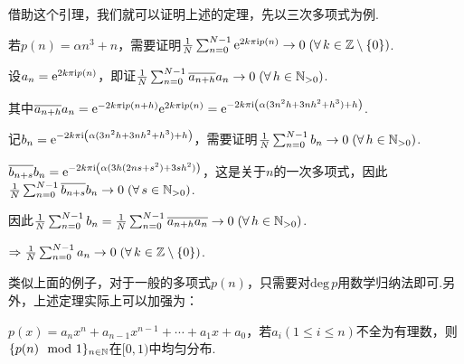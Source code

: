 借助这个引理，我们就可以证明上述的定理，先以三次多项式为例.
\begin{instance}
    若$p(n)=\alpha n^3+n$，需要证明$\frac{1}{N}\sum_{n=0}^{N-1}{\mathrm{e}^{2k\pi \mathrm{i} p(n)}}\to 0\;(\forall\, k\in\mathbb{Z}\setminus\{0\})$.\par
    设$a_n=\mathrm{e}^{2k\pi \mathrm{i} p(n)}$，即证$\frac{1}{N}\sum_{n=0}^{N-1}{\overline{a_{n+h}}a_n}\to 0\;(\forall\, h\in\mathbb{N}_{>0})$. \par
    其中$\overline{a_{n+h}}a_n=\mathrm{e}^{-2k\pi \mathrm{i} p(n+h)}\mathrm{e}^{2k\pi \mathrm{i} p(n)}=\mathrm{e}^{-2k\pi \mathrm{i} \left(\alpha(3n^2h+3nh^2+h^3)+h\right)}$.\par
    记$b_n=\mathrm{e}^{-2k\pi \mathrm{i} \left(\alpha(3n^2h+3nh^2+h^3)+h\right)}$，需要证明$\frac{1}{N}\sum_{n=0}^{N-1}{b_n}\to 0\;(\forall\, h\in\mathbb{N}_{>0})$.\par
    $\overline{b_{n+s}}b_n=\mathrm{e}^{-2k\pi\mathrm{i} \left(\alpha(3h(2ns+s^2)+3sh^2)\right)}$，这是关于$n$的一次多项式，因此$\frac{1}{N}\sum_{n=0}^{N-1}{\overline{b_{n+s}}b_n}\to 0\;(\forall\, s\in\mathbb{N}_{>0})$.\par
    因此$\frac{1}{N}\sum_{n=0}^{N-1}b_n=\frac{1}{N}\sum_{n=0}^{N-1}{\overline{a_{n+h}a_n}}\to 0\;(\forall\,h\in\mathbb{N}_{>0})$. \par
    $\Rightarrow \frac{1}{N}\sum_{n=0}^{N-1}{a_n}\to 0\;(\forall\, k\in\mathbb{Z}\setminus\{0\})$.
\end{instance}
类似上面的例子，对于一般的多项式$p(n)$，只需要对$\mathrm{deg}\, p$用数学归纳法即可.另外，上述定理实际上可以加强为：
\begin{theorem}{}
    $p(x)=a_nx^n+a_{n-1}x^{n-1}+\cdots+a_1x+a_0$，若$a_i(1\leq i\leq n)$不全为有理数，则$\{p(n)\mod 1\}_{n\in\mathbb{N}}$在$[0,1)$中均匀分布.
\end{theorem}
